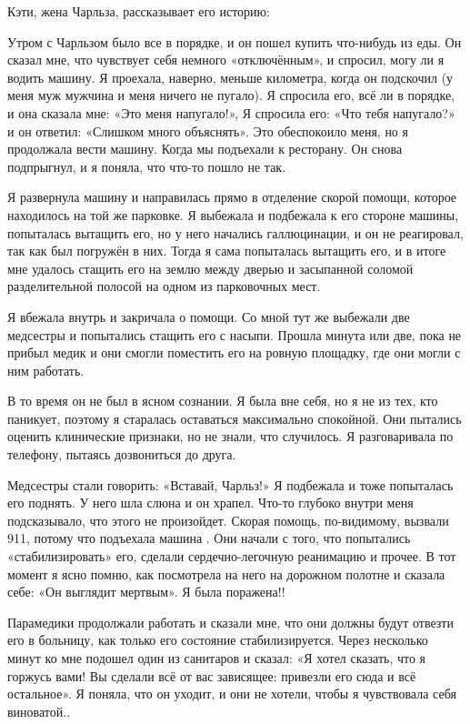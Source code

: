 Кэти, жена Чарльза, рассказывает его историю:

Утром с Чарльзом было все в порядке, и он пошел купить что-нибудь из еды. Он
сказал мне, что чувствует себя немного «отключённым», и спросил, могу ли я
водить машину. Я проехала, наверно, меньше километра, когда он подскочил (у меня
муж мужчина и меня ничего не пугало). Я спросила его, всё ли в порядке, и она
сказала мне: «Это меня напугало!», Я спросила его: «Что тебя напугало?» и он
ответил: «Слишком много объяснять». Это обеспокоило меня, но я продолжала вести
машину. Когда мы подъехали к ресторану. Он снова подпрыгнул, и я поняла, что
что-то пошло не так.

Я развернула машину и направилась прямо в отделение скорой помощи, которое
находилось на той же парковке. Я выбежала и подбежала к его стороне машины,
попыталась вытащить его, но у него начались галлюцинации, и он не реагировал,
так как был погружён в них. Тогда я сама попыталась вытащить его, и в итоге мне
удалось стащить его на землю между дверью и засыпанной соломой разделительной
полосой на одном из парковочных мест.

Я вбежала внутрь и закричала о помощи. Со мной тут же выбежали две медсестры и
попытались стащить его с насыпи. Прошла минута или две, пока не прибыл медик и
они смогли поместить его на ровную площадку, где они могли с ним работать.

В то время он не был в ясном сознании. Я была вне себя, но я не из тех, кто
паникует, поэтому я старалась оставаться максимально спокойной. Они пытались
оценить клинические признаки, но не знали, что случилось. Я разговаривала по
телефону, пытаясь дозвониться до друга.

Медсестры стали говорить: «Вставай, Чарльз!» Я подбежала и тоже попыталась его
поднять. У него шла слюна и он храпел. Что-то глубоко внутри меня подсказывало,
что этого не произойдет. Скорая помощь, по-видимому, вызвали 911, потому что
подъехала машина . Они начали с того, что попытались «стабилизировать» его,
сделали сердечно-легочную реанимацию и прочее. В тот момент я ясно помню, как
посмотрела на него на дорожном полотне и сказала себе: «Он выглядит мертвым». Я
была поражена!!

Парамедики продолжали работать и сказали мне, что они должны будут отвезти его в
больницу, как только его состояние стабилизируется. Через несколько минут ко мне
подошел один из санитаров и сказал: «Я хотел сказать, что я горжусь вами! Вы
сделали всё от вас зависящее: привезли его сюда и всё остальное». Я поняла, что
он уходит, и они не хотели, чтобы я чувствовала себя виноватой..

